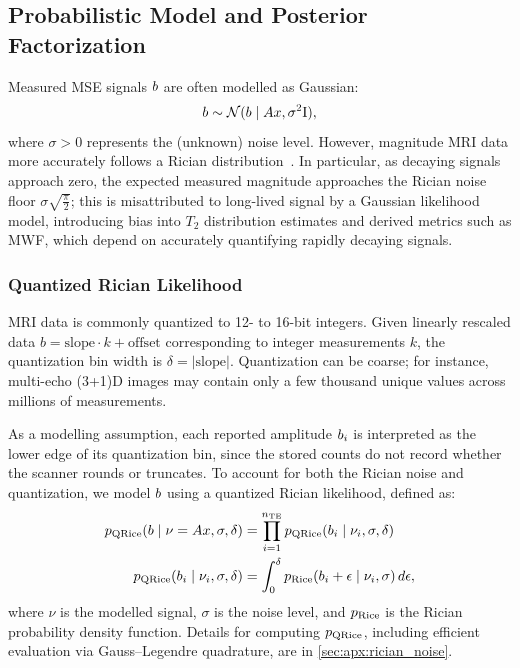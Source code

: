\subsection{Probabilistic Model and Posterior Factorization}\label{subsec:probabilistic_model}

Measured \gls*{MSE} signals $b$ are often modelled as Gaussian:
\begin{align}\label{eqn:gaussian_likelihood}
    b \sim \mathcal{N}(b \mid A x, \sigma^2 \mathrm{I}),
\end{align}
where $\sigma > 0$ represents the (unknown) noise level.
However, magnitude \gls*{MRI} data more accurately follows a Rician distribution~\citep{rice_mathematical_1944, rice_mathematical_1945, gudbjartsson_rician_1995}.
In particular, as decaying signals approach zero, the expected measured magnitude approaches the Rician noise floor $\sigma \sqrt{\frac{\pi}{2}}$;
this is misattributed to long-lived signal by a Gaussian likelihood model, introducing bias into $T_2$ distribution estimates and derived metrics such as \gls*{MWF}, which depend on accurately quantifying rapidly decaying signals.

\subsubsection{Quantized Rician Likelihood}

\gls*{MRI} data is commonly quantized to 12- to 16-bit integers.
Given linearly rescaled data $b = \mathrm{slope} \cdot k + \mathrm{offset}$ corresponding to integer measurements $k$, the quantization bin width is $\delta = |\mathrm{slope}|$.
Quantization can be coarse;
for instance, multi-echo (3+1)D images may contain only a few thousand unique values across millions of measurements.

As a modelling assumption, each reported amplitude $b_i$ is interpreted as the lower edge of its quantization bin, since the stored counts do not record whether the scanner rounds or truncates.
To account for both the Rician noise and quantization, we model $b$ using a quantized Rician likelihood, defined as:
\begin{align}
    p_{\operatorname{QRice}}(b \mid \nu = A x, \sigma, \delta) & = \prod_{i=1}^{n_{\mathrm{TE}}} p_{\operatorname{QRice}}(b_{i} \mid \nu_{i}, \sigma, \delta) \label{eqn:qrice_likelihood_product}     \\
    p_{\operatorname{QRice}}(b_{i} \mid \nu_{i}, \sigma, \delta)             & = \int_{0}^{\delta} p_{\operatorname{Rice}}(b_{i} + \epsilon \mid \nu_{i}, \sigma) \, d\epsilon, \label{eqn:qrice_likelihood}
\end{align}
where $\nu$ is the modelled signal, $\sigma$ is the noise level, and $p_{\operatorname{Rice}}$ is the Rician probability density function.
Details for computing $p_{\operatorname{QRice}}$, including efficient evaluation via Gauss--Legendre quadrature, are in \cref{sec:apx:rician_noise}.

